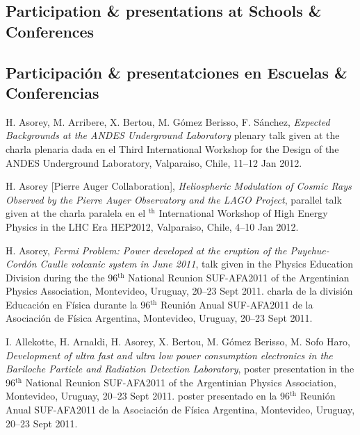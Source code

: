 \ifeng
\subsection*{Participation \& presentations at Schools \& Conferences}
\else
\subsection*{Participación \& presentatciones en Escuelas \& Conferencias}
\fi
\noindent
\begin{etaremune}
\item {} H. Asorey, M. Arribere, X. Bertou, M. Gómez Berisso, F. Sánchez, 
{\emph{Expected Backgrounds at the ANDES Underground Laboratory}}
\ifeng
plenary talk given at the 
\else
charla plenaria dada en el 
\fi
Third International Workshop for the Design of the ANDES Underground Laboratory, Valparaiso, Chile, 11--12 Jan 2012.

\item {}H. Asorey [Pierre Auger Collaboration], {\emph{Heliospheric
Modulation of Cosmic Rays Observed by the Pierre Auger Observatory and the LAGO
Project}}, 
\ifeng
parallel talk given at the 
\else
charla paralela en el 
$^{\mathrm{th}}$ International Workshop of High Energy Physics in the LHC Era HEP2012, Valparaiso, Chile, 4--10 Jan 2012.

\item {}H. Asorey, {\emph{Fermi Problem: Power developed at the eruption of
the Puyehue-Cordón Caulle volcanic system in June 2011}}, 
\ifeng
talk given in the Physics Education Division during the the 96$^{\mathrm{th}}$ National Reunion SUF-AFA2011 of the Argentinian Physics Association, Montevideo, Uruguay, 20--23 Sept 2011.
\else
charla de la división Educación en Física durante la 96$^{\mathrm{th}}$ Reunión Anual SUF-AFA2011 de la Asociación de Física Argentina, Montevideo, Uruguay, 20--23 Sept 2011.
\fi

\item {}I. Allekotte, H. Arnaldi, H. Asorey, X. Bertou, M. Gómez Berisso,
M. Sofo Haro, {\emph{Development of ultra fast and ultra low power consumption
electronics in the Bariloche Particle and Radiation Detection Laboratory}},
\ifeng
poster presentation in the 96$^{\mathrm{th}}$ National Reunion SUF-AFA2011 of the Argentinian Physics Association, Montevideo, Uruguay, 20--23 Sept 2011.
\else
poster presentado en la 96$^{\mathrm{th}}$ Reunión Anual SUF-AFA2011 de la Asociación de Física Argentina, Montevideo, Uruguay, 20--23 Sept 2011.
\fi


\end{etaremune}
